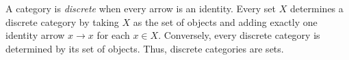 A category is \emph{discrete} when every arrow is an identity. Every set $X$ determines a discrete category by taking $X$ as the set of objects and adding exactly one identity arrow $x \to x$ for each $x \in X$. Conversely, every discrete category is determined by its set of objects. Thus, discrete categories are sets.
